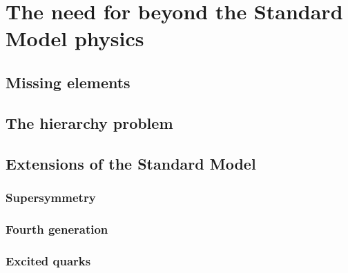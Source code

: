 \chapter{The need for beyond the Standard Model physics \label{chap:beyond_standard_model}}

\section{Missing elements \label{sec:missing_elements}}

\section{The hierarchy problem \label{sec:hierarchy_problem}}

\section{Extensions of the Standard Model \label{sec:extensions_standard_model}}

\subsection{Supersymmetry \label{sec:supersymmetry}}


\subsection{Fourth generation \label{sec:fourth_generation}}

\subsection{Excited quarks \label{sec:excited_quarks}}
